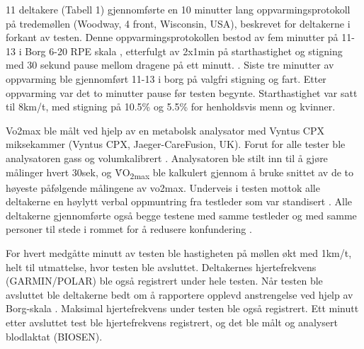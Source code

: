 \documentclass[
]{book}
\begin{document}
11 deltakere (Tabell 1) gjennomførte en 10 minutter lang oppvarmingsprotokoll på tredemøllen (Woodway, 4 front, Wisconsin, USA), beskrevet for deltakerne i forkant av testen. Denne oppvarmingsprotokollen bestod av fem minutter på 11-13 i Borg 6-20 RPE skala \citep{borg1982}, etterfulgt av 2x1min på starthastighet og stigning med 30 sekund pause mellom dragene på ett minutt. . Siste tre minutter av oppvarming ble gjennomført 11-13 i borg på valgfri stigning og fart. Etter oppvarming var det to minutter pause før testen begynte. Starthastighet var satt til 8km/t, med stigning på 10.5\% og 5.5\% for henholdsvis menn og kvinner.

Vo2max ble målt ved hjelp av en metabolsk analysator med Vyntus CPX miksekammer (Vyntus CPX, Jaeger-CareFusion, UK). Forut for alle tester ble analysatoren gass og volumkalibrert . Analysatoren ble stilt inn til å gjøre målinger hvert 30sek, og V̇O\textsubscript{2max} ble kalkulert gjennom å bruke snittet av de to høyeste påfølgende målingene av vo2max. Underveis i testen mottok alle deltakerne en høylytt verbal oppmuntring fra testleder som var standisert \citep{halperin2015}. Alle deltakerne gjennomførte også begge testene med samme testleder og med samme personer til stede i rommet for å redusere konfundering \citep{halperin2015}.

For hvert medgåtte minutt av testen ble hastigheten på møllen økt med 1km/t, helt til utmattelse, hvor testen ble avsluttet. Deltakernes hjertefrekvens (GARMIN/POLAR) ble også registrert under hele testen. Når testen ble avsluttet ble deltakerne bedt om å rapportere opplevd anstrengelse ved hjelp av Borg-skala \citep{borg1982}. Maksimal hjertefrekvens under testen ble også registrert. Ett minutt etter avsluttet test ble hjertefrekvens registrert, og det ble målt og analysert blodlaktat (BIOSEN).

\hypertarget{section}{%
\section{}\label{section}}

\providecommand{\docline}[3]{\noalign{\global\setlength{\arrayrulewidth}{#1}}\arrayrulecolor[HTML]{#2}\cline{#3}}

\setlength{\tabcolsep}{2pt}

\renewcommand*{\arraystretch}{1.5}
\end{document}
